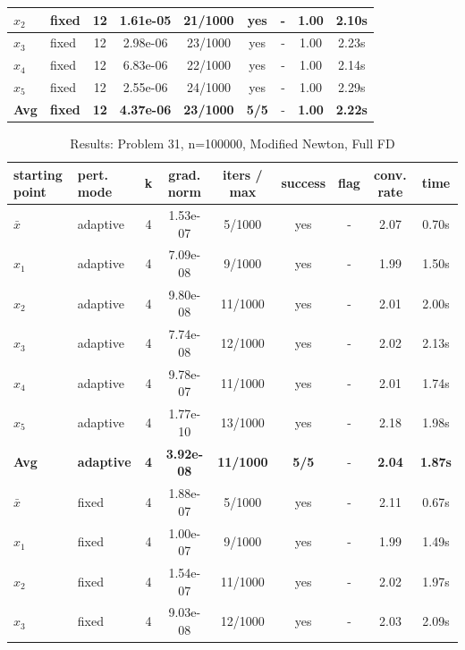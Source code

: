 \begin{longtable}{|l|l|c|c|c|c|c|c|c|}
\hline
$x_2$ & fixed & 12 & 1.61e-05 & 21/1000 & yes & - & 1.00 & 2.10s \\
\hline
$x_3$ & fixed & 12 & 2.98e-06 & 23/1000 & yes & - & 1.00 & 2.23s \\
\hline
$x_4$ & fixed & 12 & 6.83e-06 & 22/1000 & yes & - & 1.00 & 2.14s \\
\hline
$x_5$ & fixed & 12 & 2.55e-06 & 24/1000 & yes & - & 1.00 & 2.29s \\
\hline
\hline\hline
\textbf{Avg} & \textbf{fixed} & \textbf{12} & \textbf{4.37e-06} & \textbf{23/1000} & \textbf{5/5} & - & \textbf{1.00} & \textbf{2.22s} \\
\hline\hline
\end{longtable}


\begin{longtable}{|l|l|c|c|c|c|c|c|c|}
\caption{Results: Problem 31, n=100000, Modified Newton, Full FD} \\
\hline
\textbf{starting point} & \textbf{pert. mode} & \textbf{k} & \textbf{grad. norm} & \textbf{iters / max} & \textbf{success} & \textbf{flag} & \textbf{conv. rate} & \textbf{time} \\
\hline
\endfirsthead
\endhead
\endfoot
\hline
\endlastfoot
$\bar{x}$ & adaptive & 4 & 1.53e-07 & 5/1000 & yes & - & 2.07 & 0.70s \\
\hline
$x_1$ & adaptive & 4 & 7.09e-08 & 9/1000 & yes & - & 1.99 & 1.50s \\
\hline
$x_2$ & adaptive & 4 & 9.80e-08 & 11/1000 & yes & - & 2.01 & 2.00s \\
\hline
$x_3$ & adaptive & 4 & 7.74e-08 & 12/1000 & yes & - & 2.02 & 2.13s \\
\hline
$x_4$ & adaptive & 4 & 9.78e-07 & 11/1000 & yes & - & 2.01 & 1.74s \\
\hline
$x_5$ & adaptive & 4 & 1.77e-10 & 13/1000 & yes & - & 2.18 & 1.98s \\
\hline
\hline\hline
\textbf{Avg} & \textbf{adaptive} & \textbf{4} & \textbf{3.92e-08} & \textbf{11/1000} & \textbf{5/5} & - & \textbf{2.04} & \textbf{1.87s} \\
\hline\hline
\hline
$\bar{x}$ & fixed & 4 & 1.88e-07 & 5/1000 & yes & - & 2.11 & 0.67s \\
\hline
$x_1$ & fixed & 4 & 1.00e-07 & 9/1000 & yes & - & 1.99 & 1.49s \\
\hline
$x_2$ & fixed & 4 & 1.54e-07 & 11/1000 & yes & - & 2.02 & 1.97s \\
\hline
$x_3$ & fixed & 4 & 9.03e-08 & 12/1000 & yes & - & 2.03 & 2.09s \\

\end{longtable}
